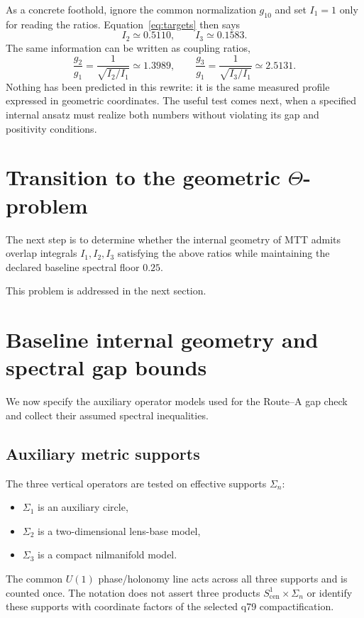 \documentclass[11pt]{article}
\begin{document}
As a concrete foothold, ignore the common normalization $g_{10}$ and set
$I_1=1$ only for reading the ratios.  Equation~\eqref{eq:targets} then says
\[
 I_2\simeq0.5110,\qquad I_3\simeq0.1583.
\]
The same information can be written as coupling ratios,
\[
 \frac{g_2}{g_1}=\frac{1}{\sqrt{I_2/I_1}}\simeq1.3989,
 \qquad
 \frac{g_3}{g_1}=\frac{1}{\sqrt{I_3/I_1}}\simeq2.5131.
\]
Nothing has been predicted in this rewrite: it is the same measured profile
expressed in geometric coordinates.  The useful test comes next, when a
specified internal ansatz must realize both numbers without violating its gap
and positivity conditions.

\section{Transition to the geometric \texorpdfstring{$\Theta$}{Theta}-problem}

The next step is to determine whether the internal geometry of MTT
admits overlap integrals $I_1,I_2,I_3$ satisfying the above ratios
while maintaining the declared baseline spectral floor $0.25$.

This problem is addressed in the next section.
\section{Baseline internal geometry and spectral gap bounds}

We now specify the auxiliary operator models used for the Route--A gap check
and collect their assumed spectral inequalities.

\subsection{Auxiliary metric supports}

The three vertical operators are tested on effective supports $\Sigma_n$:
\begin{itemize}
\item $\Sigma_1$ is an auxiliary circle,
\item $\Sigma_2$ is a two-dimensional lens-base model,
\item $\Sigma_3$ is a compact nilmanifold model.
\end{itemize}
The common $U(1)$ phase/holonomy line acts across all three supports and is
counted once. The notation does not assert three products
$S^1_{\mathrm{cen}}\times\Sigma_n$ or identify these supports with coordinate
factors of the selected q79 compactification.
\end{document}
